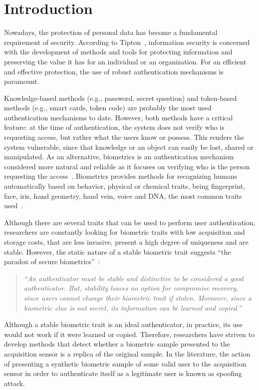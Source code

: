 \section{Introduction}\label{sec:introduction}

Nowadays, the protection of personal data has become a fundamental requirement of security. According to Tipton~\cite{Tipton:CRC:2003}, information security is concerned with the development of methods and tools for protecting information and preserving the value it has for an individual or an organization. For an efficient and effective protection, the use of robust authentication mechanisms is paramount.

Knowledge-based methods (e.g., password, secret question) and token-based methods (e.g., smart cards, token code) are probably the most used authentication mechanisms to date. However, both methods have a critical feature: at the time of authentication, the system does not verify who is requesting access, but rather what the users know or possess. This renders the system vulnerable, since that knowledge or an object can easily be lost, shared or manipulated. As an alternative, biometrics is an authentication mechanism considered more natural and reliable as it focuses on verifying who is the person requesting the access~\cite{Jain:IB:2011}. Biometrics provides methods for recognizing humans automatically based on behavior, physical or chemical traits, being fingerprint, face, iris, hand geometry, hand vein, voice and DNA, the most common traits used~\cite{Jain:IB:2011}.

Although there are several traits that can be used to perform user authentication, researchers are constantly looking for biometric traits with low acquisition and storage costs, that are less invasive, present a high degree of uniqueness and are stable. However, the static nature of a stable biometric trait suggests ``the paradox of secure biometrics''~\cite{Gorman:PIEEE:2003}:

\begin{quote}
\textit{``An authenticator must be stable and distinctive to be considered a good authenticator. But, stability leaves no option for compromise recovery, since users cannot change their biometric trait if stolen. Moreover, since a biometric clue is not secret, its information can be learned and copied.''}
\end{quote}

\vspace{0.3cm}

Although a stable biometric trait is an ideal authenticator, in practice, its use would not work if it were learned or copied. Therefore, researchers have striven to develop methods that detect whether a biometric sample presented to the acquisition sensor is a replica of the original sample. In the literature, the action of presenting a synthetic biometric sample of some valid user to the acquisition sensor in order to authenticate itself as a legitimate user is known as spoofing attack.

